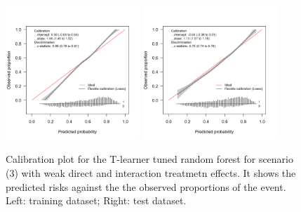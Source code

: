 \begin{figure}[htbp]
\centering
\includegraphics[width=0.45\textwidth]{img/results_ITE_simulation/small_interaction_tuned_rf_tlearnertrain_calibration_plot.png}
\includegraphics[width=0.45\textwidth]{img/results_ITE_simulation/small_interaction_tuned_rf_tlearnertest_calibration_plot.png}
\caption{Calibration plot for the T-learner tuned random forest for scenario (3) with weak direct and interaction treatmetn effects. It shows the predicted risks against the the observed proportions of the event. Left: training dataset; Right: test dataset.}
\label{fig:calibration_tuned_rf}
\end{figure}


